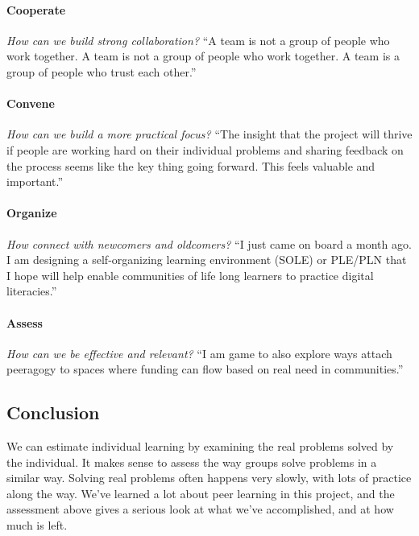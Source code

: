 \paragraph{Cooperate} \emph{How can we build strong
collaboration?} ``A team is not a group of people who work together. A
team is not a group of people who work together. A team is a group of
people who trust each other.'' 

\paragraph{Convene} \emph{How can we build a
more practical focus?} ``The insight that the project will thrive if
people are working hard on their individual problems and sharing
feedback on the process seems like the key thing going forward. This
feels valuable and important.'' 

\paragraph{Organize} \emph{How connect with
newcomers and oldcomers?} ``I just came on board a month ago. I am
designing a self-organizing learning environment (SOLE) or PLE/PLN that
I hope will help enable communities of life long learners to practice
digital literacies.'' 

\paragraph{Assess} \emph{How can we be effective and
relevant?} ``I am game to also explore ways attach peeragogy to spaces
where funding can flow based on real need in communities.''

\subsection{Conclusion}

We can estimate individual learning by examining the real problems
solved by the individual. It makes sense to assess the way groups solve
problems in a similar way. Solving real problems often happens very
slowly, with lots of practice along the way. We've learned a lot about
peer learning in this project, and the assessment above gives a serious
look at what we've accomplished, and at how much is left. 

